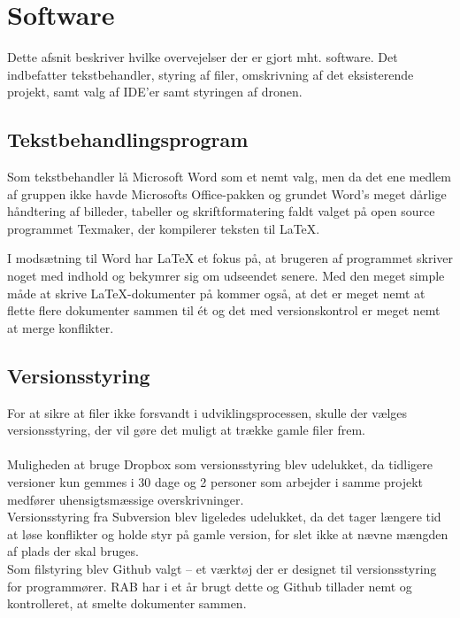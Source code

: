 \documentclass[Main]{subfiles}
\begin{document}
\chapter{Software}
Dette afsnit beskriver hvilke overvejelser der er gjort mht. software.
Det indbefatter tekstbehandler, styring af filer, omskrivning af det eksisterende projekt, samt valg af IDE'er samt styringen af dronen.


\section{Tekstbehandlingsprogram}

Som tekstbehandler lå Microsoft Word som et nemt valg, men da det ene medlem af gruppen ikke havde Microsofts Office-pakken og grundet Word's meget dårlige håndtering af billeder, tabeller og skriftformatering faldt valget på open source programmet Texmaker\cite{Texmaker}, der kompilerer teksten til LaTeX.

I modsætning til Word har LaTeX et fokus på, at brugeren af programmet skriver noget med indhold og bekymrer sig om udseendet senere. 
Med den meget simple måde at skrive LaTeX-dokumenter på kommer også, at det er meget nemt at flette flere dokumenter sammen til ét og det med versionskontrol er meget nemt at merge konflikter.



\section{Versionsstyring}
For at sikre at filer ikke forsvandt i udviklingsprocessen, skulle der vælges  versionsstyring, der vil gøre det muligt at trække gamle filer frem.
\\
\\
Muligheden at bruge Dropbox som versionsstyring blev udelukket, da tidligere versioner kun gemmes i 30 dage\cite{Dropbox} og 2 personer som arbejder i samme projekt medfører uhensigtsmæssige overskrivninger.
\\
Versionsstyring fra Subversion blev ligeledes udelukket, da det tager længere tid at løse konflikter og holde styr på gamle version, for slet ikke at nævne mængden af plads der skal bruges.
\\
Som filstyring blev Github\cite{Github-IHA} valgt -- et værktøj der er designet til versionsstyring for programmører. 
RAB har i et år brugt dette og Github tillader nemt og kontrolleret, at smelte dokumenter sammen.
\end{document}
